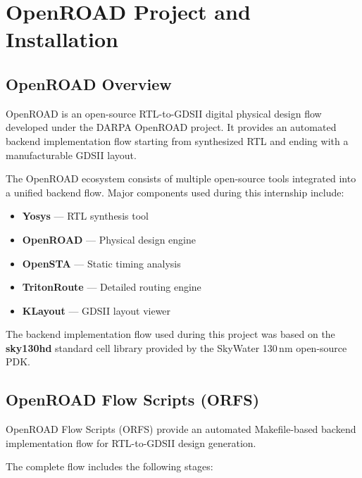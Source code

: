 \chapter{OpenROAD Project and Installation}

\section{OpenROAD Overview}

OpenROAD is an open-source RTL-to-GDSII digital physical design flow developed under the DARPA OpenROAD project. It provides an automated backend implementation flow starting from synthesized RTL and ending with a manufacturable GDSII layout.

The OpenROAD ecosystem consists of multiple open-source tools integrated into a unified backend flow. Major components used during this internship include:

\begin{itemize}
    \item \textbf{Yosys} --- RTL synthesis tool
    \item \textbf{OpenROAD} --- Physical design engine
    \item \textbf{OpenSTA} --- Static timing analysis
    \item \textbf{TritonRoute} --- Detailed routing engine
    \item \textbf{KLayout} --- GDSII layout viewer
\end{itemize}

The backend implementation flow used during this project was based on the \textbf{sky130hd} standard cell library provided by the SkyWater 130\,nm open-source PDK.

\section{OpenROAD Flow Scripts (ORFS)}

OpenROAD Flow Scripts (ORFS) provide an automated Makefile-based backend implementation flow for RTL-to-GDSII design generation.

The complete flow includes the following stages:

